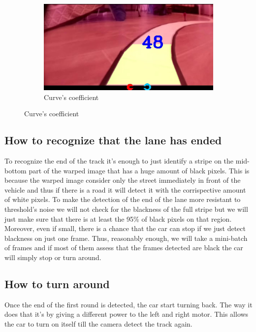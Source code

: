 \documentclass[12pt,a4paper]{article}
\begin{document}
\begin{large}
\begin{figure} [!hbp]
\begin{subfigure}[b]{0.3\textwidth}
    \end{subfigure}
    \hspace{0.1cm}
    \begin{subfigure}[b]{0.3\textwidth}
    \centering
    \captionsetup{justification=centering}
      \includegraphics[width=\textwidth]{images/final.jpg}
      \caption{Curve's coefficient  \\}
      
    \end{subfigure}
  \end{figure}
  
\subsection{How to recognize that the lane has ended}
To recognize the end of the track it's enough to just identify a stripe on the mid-bottom part of the warped image that has a huge amount of black pixels. This is because the warped image consider only the street immediately in front of the vehicle and thus if there is a road it will detect it with the corrispective amount of white pixels. To make the detection of the end of the lane more resistant to threshold's noise we will not check for the blackness of the full stripe but we will just make sure that there is at least the 95\% of black pixels on that region. \\
Moreover, even if small, there is a chance that the car can stop if we just detect blackness on just one frame. Thus, reasonably enough, we will take a mini-batch of frames and if most of them assess that the frames detected are black the car will simply stop or turn around.  

\subsection{How to turn around}
Once the end of the first round is detected, the car start turning back. The way it does that it's by giving a different power to the left and right motor. This allows the car to turn on itself till the camera detect the track again.\\



\end{large}
\end{document}
